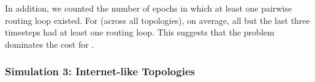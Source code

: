

In addition, we counted the number of epochs in which at least one pairwise routing loop existed.  For \second (across all topologies), on average, all but the last three 
timesteps had at least one routing loop.  This suggests that the \infinity problem dominates the cost for \seconds. 






\subsubsection{Simulation 3: Internet-like Topologies}



